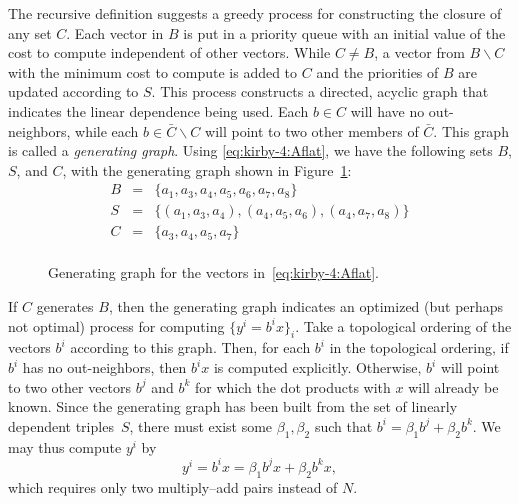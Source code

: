 The recursive definition suggests a greedy process for constructing
the closure of any set $ C $. Each vector in $B$ is put in a priority
queue with an initial value of the cost to compute independent of other
vectors. While $C \ne B$, a vector from $B \backslash C$ with the
minimum cost to compute is added to $C$ and the priorities of $B$ are
updated according to $S$. This process constructs a directed, acyclic
graph that indicates the linear dependence being used. Each $ b \in C
$ will have no out-neighbors, while each $ b \in \bar{C} \backslash C
$ will point to two other members of $ \bar{C} $. This graph is
called a \emph{generating graph}. Using \eqref{eq:kirby-4:Aflat}, we
have the following sets $B$, $S$, and $C$, with the generating graph
shown in Figure~\ref{fig:kirby-4:gg}:
\begin{equation}
\begin{array}{rcl}
 B & = &  \{a_1, a_3, a_4, a_5, a_6, a_7, a_8\} \\
 S & = & \{(a_1, a_3, a_4),(a_4, a_5, a_6), (a_4, a_7, a_8)\} \\
 C & = & \{a_3, a_4, a_5, a_7\} \\
\end{array}
\end{equation}

\begin{figure}
  \center
  \def\svgwidth{\columnwidth} %
   
  \caption{Generating graph for the vectors in~\eqref{eq:kirby-4:Aflat}.}
  \label{fig:kirby-4:gg}
\end{figure}

If $C$ generates $B$, then the generating graph indicates an optimized
(but perhaps not optimal) process for computing $\{ y^i = b^i x \}_i$.
Take a topological ordering of the vectors $b^i$ according to this
graph. Then, for each $b^i$ in the topological ordering, if $b^i$ has
no out-neighbors, then $b^i x$ is computed explicitly. Otherwise,
$b^i$ will point to two other vectors $b^j$ and $b^k$ for which the
dot products with $x$ will already be known. Since the generating
graph has been built from the set of linearly dependent triples~$S$,
there must exist some $\beta_1, \beta_2$ such that $b^i = \beta_1 b^j
+ \beta_2 b^k$. We may thus compute $y^i$ by
\begin{equation}
y^i = b^i x = \beta_1 b^j x
+ \beta_2  b^k  x,
\end{equation}
which requires only two multiply--add pairs instead of $ N $.

